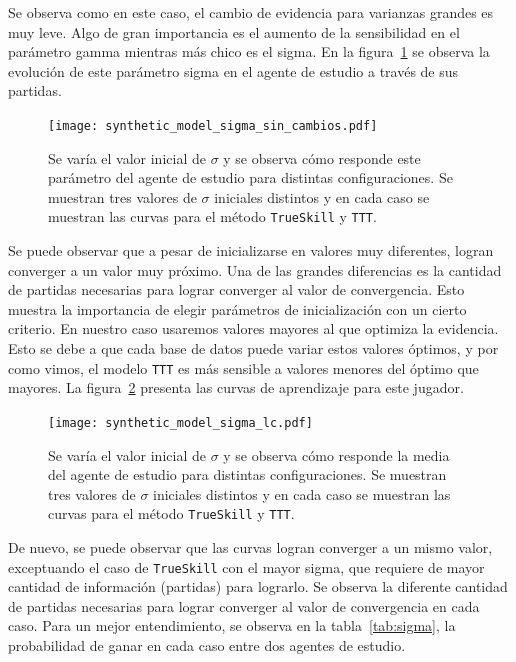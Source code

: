 \documentclass[11pt,twoside,spanish]{report} %
\begin{document}
Se observa como en este caso, el cambio de evidencia para varianzas grandes es muy leve.
Algo de gran importancia es el aumento de la sensibilidad en el par\'ametro gamma mientras m\'as chico es el sigma.
En la figura~\ref{fig:sigma}  se observa la evoluci\'on de este par\'ametro sigma en el agente de estudio a trav\'es de sus partidas.

\begin{figure}[H]
	\centering
	\texttt{[image: synthetic\_model\_sigma\_sin\_cambios.pdf]}
    \caption{Se var\'ia el valor inicial de $\sigma$ y se observa c\'omo responde este par\'ametro del agente de estudio para distintas configuraciones. Se muestran tres valores de $\sigma$ iniciales distintos y en cada caso se muestran las curvas para el m\'etodo \texttt{TrueSkill} y \texttt{TTT}.}
	\label{fig:sigma}
\end{figure}


Se puede observar que a pesar de inicializarse en valores muy diferentes, logran converger a un valor muy pr\'oximo.
Una de las grandes diferencias es la cantidad de partidas necesarias para lograr converger al valor de convergencia.
Esto muestra la importancia de elegir par\'ametros de inicializaci\'on con un cierto criterio.
En nuestro caso usaremos valores mayores al que optimiza la evidencia.
Esto se debe a que cada base de datos puede variar estos valores \'optimos, y por como vimos, el modelo \texttt{TTT} es m\'as sensible a valores menores del \'optimo que mayores.
La figura~\ref{fig:sigma_lc} presenta las curvas de aprendizaje para este jugador.

\begin{figure}[H]
	\centering
	\texttt{[image: synthetic\_model\_sigma\_lc.pdf]}
	\caption{Se var\'ia el valor inicial de $\sigma$ y se observa c\'omo responde la media del agente de estudio para distintas configuraciones. Se muestran tres valores de $\sigma$ iniciales distintos y en cada caso se muestran las curvas para el m\'etodo \texttt{TrueSkill} y \texttt{TTT}.}
	\label{fig:sigma_lc}
\end{figure}

De nuevo, se puede observar que las curvas logran converger a un mismo valor, exceptuando el caso de \texttt{TrueSkill} con el mayor sigma, que requiere de mayor cantidad de informaci\'on (partidas) para lograrlo.
Se observa la diferente cantidad de partidas necesarias para lograr converger al valor de convergencia en cada caso.
Para un mejor entendimiento, se observa en la tabla~\ref{tab:sigma}, la probabilidad de ganar en cada caso entre dos agentes de estudio.
\end{document}
